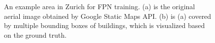 \begin{figure}[!h]
	\centering
    \caption[An example area in Zurich for FPN training]{An example area in Zurich for FPN training. (a) is the original aerial image obtained by Google Static Maps API. (b) is (a) covered by multiple bounding boxes of buildings, which is visualized based on the ground truth.}
	\label{fig:egareafpn}
\end{figure}